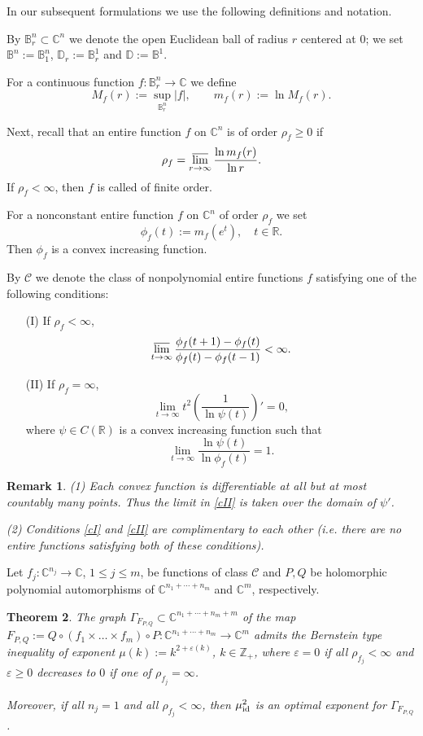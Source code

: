 \documentclass[11pt, oneside]{amsart}
\newtheorem{Th}{Theorem}[section]
\newtheorem{R}[Th]{Remark}
\begin{document}
In our subsequent formulations we use the following definitions and notation.\smallskip

By $\mathbb B_r^n\subset\mathbb C^n$ we denote the open Euclidean ball of radius $r$ centered at $0$; we set
$\mathbb B^n:=\mathbb B_1^n$, $ \mathbb D_r:=\mathbb B_r^1$ and $\mathbb D:=\mathbb B^1$.

For a continuous function $f:\mathbb B_r^n\rightarrow\mathbb C$ we define
\[
M_f(r):=\sup_{\mathbb B_r^n} |f|,\qquad m_f(r):=\ln M_f(r).
\]

Next, recall that an entire function $f$ on $\mathbb C^n$ is of order $\rho_f\ge  0$ if
\[
\rho_f= \varlimsup_{r\rightarrow\infty}\frac{\ln m_f(r)}{\ln r}.
\] 
If $\rho_f <\infty$, then $f$ is called of finite order.

For a nonconstant entire function $f$ on $\mathbb C^n$ of order $\rho_f$ we set
\[
\phi_f(t):=m_f(e^t),\quad t\in\mathbb R.
\]
Then $\phi_f$ is a convex increasing function. 

By $\mathscr C$ we denote the class of nonpolynomial entire functions $f$ satisfying one of the following conditions:
\begin{itemize}
\item[(I)]
If $\rho_f<\infty$,
\begin{equation}\label{cI}
\varlimsup_{t\rightarrow\infty}\frac{\phi_f(t+1)-\phi_f(t)}{\phi_f(t)-\phi_f(t-1)}<\infty .
\end{equation}
\item[(II)]
If $\rho_f=\infty$, 
\begin{equation}\label{cII}
\lim_{t\rightarrow\infty}t^2\left(\frac{1}{\ln\psi(t)}\right)'=0,
\end{equation}
where $\psi\in C(\mathbb R)$ is a convex increasing function such that
\[
\lim_{t\rightarrow\infty}\frac{\ln\psi(t)}{\ln\phi_f(t)}=1.
\]
\end{itemize}
\begin{R}
{\rm (1) Each convex function is differentiable at all but at most countably many points. Thus the limit in \eqref{cII} is taken over the domain of $\psi'$.\smallskip

\noindent (2) Conditions \eqref{cI} and \eqref{cII} are complimentary to each other (i.e. there are no entire functions satisfying both of these conditions). 
}
\end{R}

Let $f_j:\mathbb C^{n_j}\rightarrow\mathbb C$, $1\le j\le m$, be functions of class $\mathscr C$ and $P,Q$ be holomorphic polynomial automorphisms of  $\mathbb C^{n_1+\cdots +n_m}$ and $\mathbb C^m$, respectively. 
\begin{Th}\label{theo1.7}
The graph
$\Gamma_{F_{P,Q}}\subset\mathbb C^{n_1+\cdots +n_m+m}$ of the map $F_{P,Q}:=Q\circ (f_1\times\dots\times f_m)\circ P:\mathbb C^{n_1+\cdots+n_m}\rightarrow\mathbb C^m$ admits the Bernstein type inequality of exponent $\mu(k):=k^{2+\varepsilon (k)}$, $k\in\mathbb Z_+$, where $\varepsilon= 0$ if all $\rho_{f_j}<\infty$ and $\varepsilon\ge 0$ decreases to $0$ if one of $\rho_{f_j}=\infty$.

Moreover, if all $n_j=1$ and all $\rho_{f_j}<\infty$, then $\mu_{{\rm id}}^2$ is an optimal exponent for $\Gamma_{F_{P,Q}}$.
\end{Th}
\end{document}

